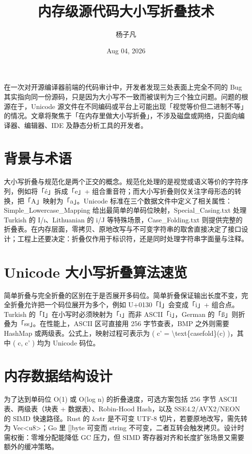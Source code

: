 \title{内存级源代码大小写折叠技术}
\author{杨子凡}
\date{Aug 04, 2026}
\maketitle
在一次对开源编译器前端的代码审计中，开发者发现三处表面上完全不同的 Bug 其实指向同一份源码，只是因为大小写不一致而被误判为三个独立问题。问题的根源在于，Unicode 源文件在不同编码或平台上可能出现「视觉等价但二进制不等」的情况。文章将聚焦于「在内存里做大小写折叠」，不涉及磁盘或网络，只面向编译器、编辑器、IDE 及静态分析工具的开发者。\par
\chapter{背景与术语}
大小写折叠与规范化是两个正交的概念。规范化处理的是视觉或语义等价的字符序列，例如将「é」拆成「e」+ 组合重音符；而大小写折叠则仅关注字母形态的转换，把「A」映射为「a」。Unicode 标准在三个数据文件中定义了相关属性：Simple\_{}Lowercase\_{}Mapping 给出最简单的单码位映射，Special\_{}Casing.txt 处理 Turkish 的 I/ı、Lithuanian 的 i/J 等特殊场景，Case\_{}Folding.txt 则提供完整的折叠表。在内存层面，零拷贝、原地改写与不可变字符串的取舍直接决定了接口设计；工程上还要决定：折叠仅作用于标识符，还是同时处理字符串字面量与注释。\par
\chapter{Unicode 大小写折叠算法速览}
简单折叠与完全折叠的区别在于是否展开多码位。简单折叠保证输出长度不变，完全折叠允许把一个码位展开为多个，例如 U+0130「İ」会变成「i」+ 组合点。Turkish 的「I」在小写时必须映射为「ı」而非 ASCII「i」，German 的「ß」则折叠为「ss」。在性能上，ASCII 区可直接用 256 字节查表，BMP 之外则需要 HashMap 或两级表。公式上，映射过程可表示为 ( c' = \textbackslash{}text\{{}casefold\}{}(c) )，其中 ( c, c' ) 均为 Unicode 码位。\par
\chapter{内存数据结构设计}
为了达到单码位 O(1) 或 O(log n) 的折叠速度，可选方案包括 256 字节 ASCII 表、两级表（块表 + 数据表）、Robin-Hood Hash，以及 SSE4.2/AVX2/NEON 的 SIMD 快速路径。Rust 的 \&{}str 是不可变 UTF-8 切片，若要原地改写，需先转为 Vec<u8>；Go 里 []byte 可变而 string 不可变，二者互转会触发拷贝。设计时需权衡：零堆分配能降低 GC 压力，但 SIMD 寄存器对齐和长度扩张场景又需要额外的缓冲策略。\par
